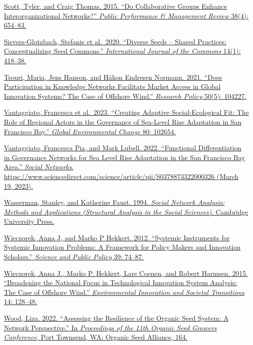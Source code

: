 \documentclass[twoside,12pt,final]{ucthesis-CA2012}
\begin{document}
\begin{ucmainmatter}
\href{https://www.zotero.org/google-docs/?hv36Bh}{Scott, Tyler, and Craig Thomas. 2015. ``Do Collaborative Groups Enhance
Interorganizational Networks?'' \emph{Public Performance \& Management Review}
38(4): 654--83.}

\href{https://www.zotero.org/google-docs/?hv36Bh}{Sievers-Glotzbach, Stefanie et al.~2020. ``Diverse Seeds -- Shared
Practices: Conceptualizing Seed Commons.'' \emph{International Journal of the
Commons} 14(1): 418--38.}

\href{https://www.zotero.org/google-docs/?hv36Bh}{Tsouri, Maria, Jens Hanson, and Håkon Endresen Normann. 2021. ``Does
Participation in Knowledge Networks Facilitate Market Access in Global
Innovation Systems? The Case of Offshore Wind.'' \emph{Research Policy} 50(5):
104227.}

\href{https://www.zotero.org/google-docs/?hv36Bh}{Vantaggiato, Francesca et al.~2023. ``Creating Adaptive
Social-Ecological Fit: The Role of Regional Actors in the Governance of
Sea-Level Rise Adaptation in San Francisco Bay.'' \emph{Global Environmental
Change} 80: 102654.}

\href{https://www.zotero.org/google-docs/?hv36Bh}{Vantaggiato, Francesca Pia, and Mark Lubell. 2022. ``Functional
Differentiation in Governance Networks for Sea Level Rise Adaptation in
the San Francisco Bay Area.'' \emph{Social Networks}.
https://www.sciencedirect.com/science/article/pii/S0378873322000326
(March 19, 2023).}

\href{https://www.zotero.org/google-docs/?hv36Bh}{Wasserman, Stanley, and Katherine Faust. 1994. \emph{Social Network
Analysis: Methods and Applications (Structural Analysis in the Social
Sciences)}. Cambridge University
Press.}

\href{https://www.zotero.org/google-docs/?hv36Bh}{Wieczorek, Anna J, and Marko P Hekkert. 2012. ``Systemic Instruments for
Systemic Innovation Problems: A Framework for Policy Makers and
Innovation Scholars.'' \emph{Science and Public Policy} 39:
74--87.}

\href{https://www.zotero.org/google-docs/?hv36Bh}{Wieczorek, Anna J., Marko P. Hekkert, Lars Coenen, and Robert Harmsen.
2015. ``Broadening the National Focus in Technological Innovation System
Analysis: The Case of Offshore Wind.'' \emph{Environmental Innovation and
Societal Transitions} 14:
128--48.}

\href{https://www.zotero.org/google-docs/?hv36Bh}{Wood, Liza. 2022. ``Assessing the Resilience of the Organic Seed System:
A Network Perspective.'' In \emph{Proceedings of the 11th Organic Seed Growers
Conference}, Port Townsend, WA: Organic Seed Alliance,
164.}


\end{ucmainmatter}
\end{document}
